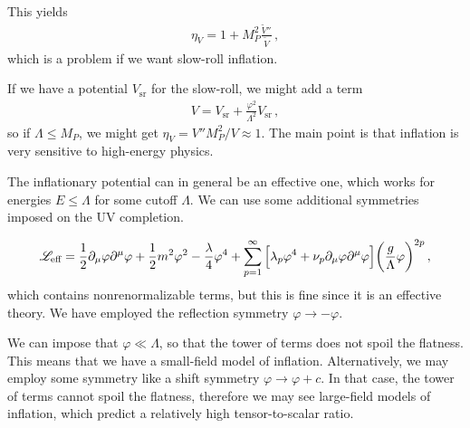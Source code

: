 \documentclass[main.tex]{subfiles}
\begin{document}
This yields 
%
\begin{align}
\eta _V = 1 + M_P^2 \frac{\widetilde{V}''}{\widetilde{V}}
\,,
\end{align}
%
which is a problem if we want slow-roll inflation. 

If we have a potential \(V _{\text{sr}}\) for the slow-roll, we might add a term 
%
\begin{align}
V = V _{\text{sr}} + \frac{\varphi^2}{\Lambda^2} V _{\text{sr}}
\,,
\end{align}
%
so if \(\Lambda \leq M_P\), we might get \(\eta _V = V'' M_P^2 / V \approx 1\). 
The main point is that inflation is very sensitive to high-energy physics. 

The inflationary potential can in general be an effective one, which works for energies \(E \leq \Lambda \) for some cutoff \(\Lambda \). 
We can use some additional symmetries imposed on the UV completion. 

%
\begin{align}
\mathscr{L} _{\text{eff}} = \frac{1}{2} \partial_{\mu } \varphi \partial^{\mu } \varphi + \frac{1}{2} m^2 \varphi^2 - \frac{\lambda}{4} \varphi^{4}
+ \sum _{p=1}^{\infty } \qty[\lambda _p \varphi^{4} + \nu _p \partial_{\mu } \varphi \partial^{\mu }\varphi ] \qty( \frac{g}{\Lambda } \varphi )^{2p}
\,,
\end{align}
%
which contains nonrenormalizable terms, but this is fine since it is an effective theory. 
We have employed the reflection symmetry \(\varphi \to - \varphi \). 

We can impose that \(\varphi \ll \Lambda \), so that the tower of terms does not spoil the flatness. This means that we have a small-field model of inflation. 
Alternatively, we may employ some symmetry like a shift symmetry \(\varphi \to \varphi + c\). 
In that case, the tower of terms cannot spoil the flatness, therefore we may see large-field models of inflation, which predict a relatively high tensor-to-scalar ratio. 
\end{document}
